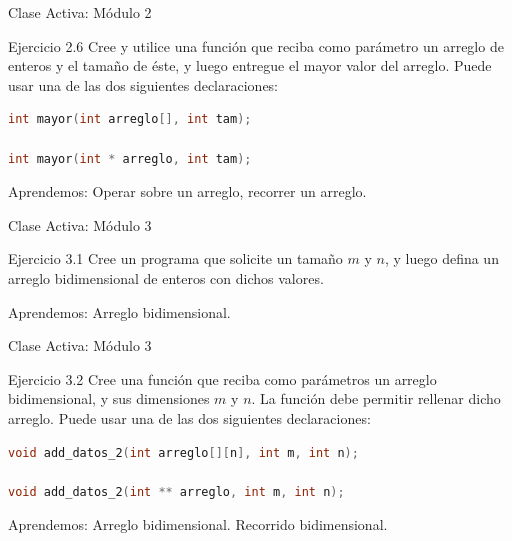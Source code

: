\documentclass{beamer}
\begin{document}
\begin{frame}[fragile]{Clase Activa: Módulo 2}
\begin{exampleblock}{Ejercicio 2.6}
Cree y utilice una función que reciba como parámetro un arreglo de enteros y el tamaño de éste, y luego entregue el mayor valor del arreglo. Puede usar una de las dos siguientes declaraciones:
\begin{lstlisting}[language=C, basicstyle=\scriptsize]
int mayor(int arreglo[], int tam);

int mayor(int * arreglo, int tam);
\end{lstlisting}
\end{exampleblock}

{\tiny Aprendemos: Operar sobre un arreglo, recorrer un arreglo.}
\end{frame}


\begin{frame}[fragile]{Clase Activa: Módulo 3}
\begin{exampleblock}{Ejercicio 3.1}
Cree un programa que solicite un tamaño $m$ y $n$, y luego defina un arreglo bidimensional de enteros con dichos valores.

\end{exampleblock}

{\tiny Aprendemos: Arreglo bidimensional.}
\end{frame}

\begin{frame}[fragile]{Clase Activa: Módulo 3}
\begin{exampleblock}{Ejercicio 3.2}
Cree una función que reciba como parámetros un arreglo bidimensional, y sus dimensiones $m$ y $n$. La función debe permitir rellenar dicho arreglo. Puede usar una de las dos siguientes declaraciones:
\begin{lstlisting}[language=C, basicstyle=\scriptsize]
void add_datos_2(int arreglo[][n], int m, int n);

void add_datos_2(int ** arreglo, int m, int n);
\end{lstlisting}
\end{exampleblock}

{\tiny Aprendemos: Arreglo bidimensional. Recorrido bidimensional.}
\end{frame}
\end{document}
